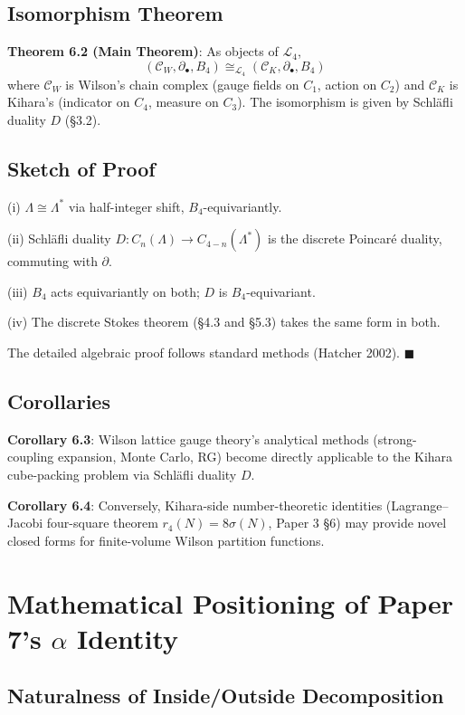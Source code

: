 \documentclass[a4paper,11pt]{article}
\begin{document}
\subsection{Isomorphism Theorem}

\textbf{Theorem 6.2 (Main Theorem)}: As objects of $\mathcal{L}_4$,
\[ (\mathcal{C}_W, \partial_\bullet, B_4) \cong_{\mathcal{L}_4} (\mathcal{C}_K, \partial_\bullet, B_4) \]
where $\mathcal{C}_W$ is Wilson's chain complex (gauge fields on $C_1$, action on $C_2$) and $\mathcal{C}_K$ is Kihara's (indicator on $C_4$, measure on $C_3$). The isomorphism is given by Schl\"afli duality $D$ (§3.2).

\subsection{Sketch of Proof}

(i) $\Lambda \cong \Lambda^*$ via half-integer shift, $B_4$-equivariantly.

(ii) Schl\"afli duality $D : C_n(\Lambda) \to C_{4-n}(\Lambda^*)$ is the discrete Poincar\'e duality, commuting with $\partial$.

(iii) $B_4$ acts equivariantly on both; $D$ is $B_4$-equivariant.

(iv) The discrete Stokes theorem (§4.3 and §5.3) takes the same form in both.

The detailed algebraic proof follows standard methods (Hatcher 2002). $\blacksquare$

\subsection{Corollaries}

\textbf{Corollary 6.3}: Wilson lattice gauge theory's analytical methods (strong-coupling expansion, Monte Carlo, RG) become directly applicable to the Kihara cube-packing problem via Schl\"afli duality $D$.

\textbf{Corollary 6.4}: Conversely, Kihara-side number-theoretic identities (Lagrange--Jacobi four-square theorem $r_4(N) = 8\sigma(N)$, Paper 3 §6) may provide novel closed forms for finite-volume Wilson partition functions.

\section{Mathematical Positioning of Paper 7's $\alpha$ Identity}

\subsection{Naturalness of Inside/Outside Decomposition}
\end{document}
